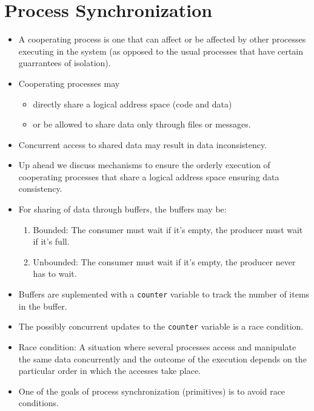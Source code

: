 \documentclass[10pt]{report}
\begin{document}
\section{Process Synchronization}
\begin{itemize}
\item A cooperating process is one that can affect or be affected by other processes executing in the system (as opposed to the usual processes that have certain guarrantees of isolation).
\item Cooperating processes may
\begin{itemize}
    \item directly share a logical address space (code and data)
    \item or be allowed to share data only through files or messages.
\end{itemize}
\item Concurrent access to shared data may result in data inconsistency.
\item Up ahead we discuss mechanisms to ensure the orderly execution of cooperating processes that share a logical address space ensuring data consistency.
\item For sharing of data through buffers, the buffers may be:
\begin{enumerate}
\item Bounded: The consumer must wait if it's empty, the producer must wait if it's full.
\item Unbounded: The consumer must wait if it's empty, the producer never has to wait.
\end{enumerate}
\item Buffers are suplemented with a \texttt{counter} variable to track the number of items in the buffer.
\item The possibly concurrent updates to the \texttt{counter} variable is a race condition.
\item Race condition: A situation where several processes access and manipulate the same data concurrently and the outcome of the execution depends on the particular order in which the accesses take place.
\item One of the goals of process synchronization (primitives) is to avoid race conditions.
\end{itemize}
\end{document}
